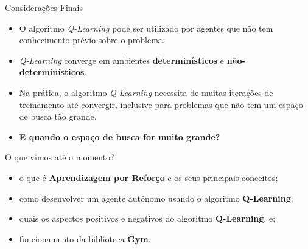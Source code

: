 \documentclass{beamer}
\begin{document}
\begin{frame}{Considerações Finais}
\begin{itemize}
	\item O algoritmo \textit{Q-Learning} pode ser utilizado por agentes que 
	não tem conhecimento prévio sobre o problema.
	
	
	
	\item \textit{Q-Learning} converge em ambientes 
	\textbf{determinísticos} e \textbf{não-determinísticos}.
	
	\item Na prática, o algoritmo \textit{Q-Learning} necessita de muitas iterações de 
	treinamento até convergir, inclusive para problemas que não tem um espaço de busca 
	tão grande.   

\pause 

	\item \textbf{E quando o espaço de busca for muito grande?} 




\end{itemize}
\end{frame}


\begin{frame}{O que vimos até o momento?}
\begin{itemize}
	\item o que é \textbf{Aprendizagem por Reforço} e os seus principais conceitos;
	\item como desenvolver um agente autônomo usando o algoritmo \textbf{Q-Learning};
	\item quais os aspectos positivos e negativos do algoritmo \textbf{Q-Learning}, e;
	\item funcionamento da biblioteca \textbf{Gym}. 
\end{itemize}
\end{frame}
\end{document}
